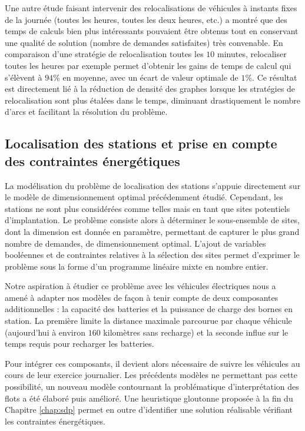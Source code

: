 \medskip
Une autre étude faisant intervenir des relocalisations de véhicules à instants fixes de la journée (toutes les heures, toutes les deux heures, etc.) a montré que des temps de calculs bien plus intéressants pouvaient être obtenus tout en conservant une qualité de solution (nombre de demandes satisfaites) très convenable.
En comparaison d'une stratégie de relocalisation toutes les $10$ minutes, relocaliser toutes les heures par exemple permet d'obtenir les gains de temps de calcul qui s'élèvent à $94$\% en moyenne, avec un écart de valeur optimale de $1$\%.
Ce résultat est directement lié à la réduction de densité des graphes lorsque les stratégies de relocalisation sont plus étalées dans le temps, diminuant drastiquement le nombre d'arcs et facilitant la résolution du problème.


\subsection*{Localisation des stations et prise en compte des contraintes énergétiques}

La modélisation du problème de localisation des stations s'appuie directement sur le modèle de dimensionnement optimal précédemment étudié.
Cependant, les stations ne sont plus considérées comme telles mais en tant que sites potentiels d'implantation.
Le problème consiste alors à déterminer le sous-ensemble de sites, dont la dimension est donnée en paramètre, permettant de capturer le plus grand nombre de demandes, \ie de dimensionnement optimal.
L'ajout de variables booléennes et de contraintes relatives à la sélection des sites permet d'exprimer le problème sous la forme d'un programme linéaire mixte en nombre entier.

\medskip
Notre aspiration à étudier ce problème avec les véhicules électriques nous a amené à adapter nos modèles de façon à tenir compte de deux composantes additionnelles : la capacité des batteries et la puissance de charge des bornes en station.
La première limite la distance maximale parcourue par chaque véhicule (aujourd'hui à environ $160$ kilomètres sans recharge) et la seconde influe sur le temps requis pour recharger les batteries.

Pour intégrer ces composants, il devient alors nécessaire de suivre les véhicules au cours de leur exercice journalier.
Les précédents modèles ne permettant pas cette possibilité, un nouveau modèle contournant la problématique d'interprétation des flots a été élaboré puis amélioré.
Une heuristique gloutonne proposée à la fin du Chapitre \ref{chap:sdp} permet en outre d'identifier une solution réalisable vérifiant les contraintes énergétiques.


